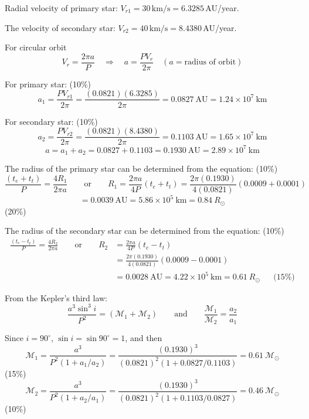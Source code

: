 Radial velocity of primary star: $V_{r1} = 30\,\mathrm{km/s}
= 6.3285$\,AU/year.

The velocity of secondary star: $V_{r2} = 40\,\mathrm{km/s}
= 8.4380$\,AU/year.

For circular orbit
\[ V_r = \frac{2\pi a}{P} \quad\Longrightarrow\quad
   a = \frac{P V_r}{2\pi} \quad (a = \text{radius of orbit}) \]

For primary star: \hfill(10\%)
\[ a_1 = \frac{P V_{r1}}{2\pi}
   = \frac{(0.0821)(6.3285)}{2\pi}
   = 0.0827\ \mathrm{AU} = 1.24 \times 10^7\ \mathrm{km} \]

For secondary star: \hfill(10\%)
\[ a_2 = \frac{P V_{r2}}{2\pi}
   = \frac{(0.0821)(8.4380)}{2\pi}
   = 0.1103\ \mathrm{AU} = 1.65 \times 10^7\ \mathrm{km} \]
\[ a = a_1 + a_2 = 0.0827 + 0.1103
   = 0.1930\ \mathrm{AU} = 2.89 \times 10^7\ \mathrm{km} \]

The radius of the primary star can be determined from the equation:
\hfill(10\%)
\[ \frac{(t_e + t_t)}{P} = \frac{4R_1}{2\pi a}
   \qquad\text{or}\qquad
   R_1 = \frac{2\pi a}{4P}(t_e + t_t)
   = \frac{2\pi(0.1930)}{4(0.0821)}(0.0009 + 0.0001) \]
\[ = 0.0039\ \mathrm{AU} = 5.86 \times 10^5\ \mathrm{km}
   = 0.84\ R_\odot \]
\hfill(20\%)

The radius of the secondary star can be determined from the equation:
\hfill(10\%)
\begin{align*}
\frac{(t_e - t_t)}{P} = \frac{4R_2}{2\pi a}
  \qquad\text{or}\qquad
  R_2 &= \frac{2\pi a}{4P}(t_e - t_t) \\
  &= \frac{2\pi(0.1930)}{4(0.0821)}(0.0009 - 0.0001) \\
  &= 0.0028\ \mathrm{AU} = 4.22 \times 10^5\ \mathrm{km} = 0.61\ R_\odot
  && \text{(15\%)}
\end{align*}

From the Kepler's third law:
\[ \frac{a^3 \sin^3 i}{P^2} = \left(\mathcal{M}_1 + \mathcal{M}_2\right)
   \qquad\text{and}\qquad
   \frac{\mathcal{M}_1}{\mathcal{M}_2} = \frac{a_2}{a_1} \]

Since $i = 90^\circ$, $\sin i = \sin 90^\circ = 1$, and then
\[ \mathcal{M}_1 = \frac{a^3}{P^2(1 + a_1/a_2)}
   = \frac{(0.1930)^3}{(0.0821)^2(1 + 0.0827/0.1103)}
   = 0.61\ \mathcal{M}_\odot \]
\hfill(15\%)
\[ \mathcal{M}_2 = \frac{a^3}{P^2(1 + a_2/a_1)}
   = \frac{(0.1930)^3}{(0.0821)^2(1 + 0.1103/0.0827)}
   = 0.46\ \mathcal{M}_\odot \]
\hfill(10\%)



